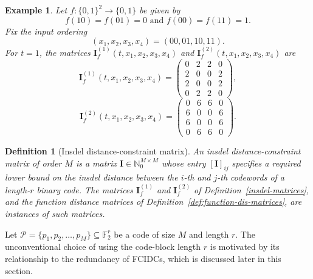 \documentclass[11 pt]{article}
\numberwithin{equation}{section}
\newtheorem{definition}[theorem]{Definition}
\newtheorem{example}[theorem]{Example}
\begin{document}
    \begin{example}\label{eg_dis_matrix}
        Let $f:\{0,1\}^2\to\{0,1\}$ be given by
        \[
        f(10)=f(01)=0 \text{ and } f(00) =  f(11)=1.
        \]
        Fix the input ordering
        \[
        (x_1,x_2,x_3,x_4)=(00,01,10,11).
        \]
        For $t=1$, the matrices $\textbf{I}_f^{(1)}(t,x_1,x_2,x_3,x_4)$ and $\textbf{I}_f^{(2)}(t,x_1,x_2,x_3,x_4)$ are
        \[
         \textbf{I}_f^{(1)}(t, x_1,x_2,x_3,x_4)=
         \begin{pmatrix}
          0 & 2 & 2 & 0\\
          2 & 0 & 0 & 2\\
          2 & 0 & 0 & 2\\
          0 & 2 & 2 & 0
         \end{pmatrix},
         \]
         \[
         \textbf{I}_f^{(2)}(t, x_1, x_2, x_3, x_4)=
         \begin{pmatrix}
          0 & 6 & 6 & 0\\
          6 & 0 & 0 & 6\\
          6 & 0 & 0 & 6\\
          0 & 6 & 6 & 0
         \end{pmatrix}.
        \]       
    \end{example}


    \begin{definition}[Insdel distance-constraint matrix]
    \label{def:dist-constraint-matrix}
    An insdel distance-constraint matrix of order $M$ is a matrix $\mathbf{I} \in \mathbb{N}_0^{M \times M}$ whose entry $[\mathbf{I}]_{ij}$ specifies a required lower bound on the insdel distance between the $i$-th and $j$-th codewords of a length-$r$ binary code. The matrices $\mathbf{I}^{(1)}_f$ and $\mathbf{I}^{(2)}_f$ of Definition~\ref{insdel-matrices}, and the function distance matrices of Definition~\ref{def:function-dis-matrices}, are instances of such matrices.
    \end{definition}

    Let $\mathcal{P} = \{p_1, p_2, \dots, p_M\} \subseteq \mathbb{F}_2^r$ be a code of size $M$ and length $r$. The unconventional choice of using the code-block length $r$ is motivated by its relationship to the redundancy of FCIDCs, which is discussed later in this section.
    
\end{document}
